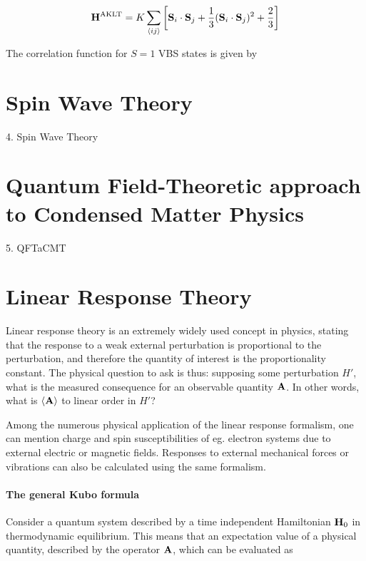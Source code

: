 \documentclass{homework}
\begin{document}
\begin{equation}
    {\bf H}^{\textnormal{AKLT}} = K \sum_{\langle ij \rangle} \bigg[{\bf S}_i \cdot {\bf S}_j + \frac{1}{3} ({\bf S}_i \cdot {\bf S}_j)^2 + \frac{2}{3}\bigg]
\end{equation}

The correlation function for $S=1$ VBS states is given by 
\fi

\section{\textbf{Spin Wave Theory}}
{4. Spin Wave Theory}
\clearpage

\section{\textbf{Quantum Field-Theoretic approach to Condensed Matter Physics}}
{5. QFTaCMT}
\clearpage

\section{Linear Response Theory}

Linear response theory is an extremely widely used concept in physics, stating that the response to a weak external perturbation is proportional to the perturbation, and therefore the quantity of interest is the proportionality constant. The physical question to ask is thus: supposing some perturbation $H'$, what is the measured consequence for an observable quantity ${\bf A}$. In other words, what is $\langle {\bf A} \rangle$ to linear order in $H'$? 

Among the numerous physical application of the linear response formalism, one can mention charge and spin susceptibilities of eg. electron systems due to external electric or magnetic fields. Responses to external mechanical forces or vibrations can also be calculated using the same formalism. \\

\paragraph{\textbf{The general Kubo formula}}

Consider a quantum system described by a time independent Hamiltonian ${\bf H}_0$ in thermodynamic equilibrium. This means that an expectation value of a physical quantity, described by the operator ${\bf A}$, which can be evaluated as 
\end{document}
